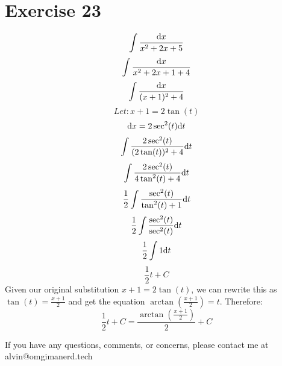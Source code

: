 \documentclass{math}
\begin{document}
\section*{Exercise 23}
\[ \int{\frac{\mathrm{d}{x}}{x^{2}+2x+5}} \]
\[ \int{\frac{\mathrm{d}{x}}{x^{2}+2x+1+4}} \]
\[ \int{\frac{\mathrm{d}{x}}{(x+1)^{2}+4}} \]
\[ Let: x+1 = 2\tan(t) \]
\[ \mathrm{d}{x} = 2\sec^{2}(t)\mathrm{d}{t} \]
\[ \int{\frac{2\sec^{2}(t)}{(2\tan(t))^{2}+4}\mathrm{d}{t}} \]
\[ \int{\frac{2\sec^{2}(t)}{4\tan^{2}(t)+4}\mathrm{d}{t}} \]
\[ \frac{1}{2}\int{\frac{\sec^{2}(t)}{\tan^{2}(t)+1}\mathrm{d}{t}} \]
\[ \frac{1}{2}\int{\frac{\sec^{2}(t)}{\sec^{2}(t)}\mathrm{d}{t}} \]
\[ \frac{1}{2}\int{1\mathrm{d}{t}} \]
\[ \frac{1}{2}t+C \]
Given our original substitution \( x+1 = 2\tan(t) \), we can rewrite this as
\( \tan(t) = \frac{x+1}{2} \) and get the equation
\( \arctan(\frac{x+1}{2}) = t \).
Therefore:
\[ \frac{1}{2}t+C = \frac{\arctan(\frac{x+1}{2})}{2}+C \]

\begin{center}
  If you have any questions, comments, or concerns, please contact me at
  alvin@omgimanerd.tech
\end{center}
\end{document}

